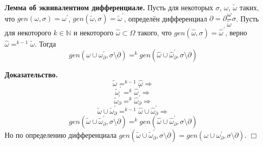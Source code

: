 \textbf{Лемма об эквивалентном дифференциале.} Пусть для некоторых $\sigma$, $\omega$, $\tilde{\omega}$ таких, что $gen(\omega, \sigma) = \omega^\prime$, $gen(\tilde{\omega}, \sigma) = \tilde{\omega}^\prime$, определён дифференциал $\partial = \partial\dfrac{\omega}{\tilde{\omega}}\sigma$. Пусть для некоторого $k \in \mathbb{N}$ и некоторого $\hat{\omega} \subset \Omega$ такого, что $gen(\hat{\omega}, \sigma) = \hat{\omega}^\prime$, верно $\hat{\omega} =^{k-1} \tilde{\omega}$. Тогда $$gen(\omega \cup \omega^\prime_\partial, \sigma\setminus\partial) =^k gen(\hat{\omega} \cup \hat{\omega}^\prime_\partial, \sigma\setminus\partial)$$

\textbf{Доказательство.}
$$\tilde{\omega} =^{k-1} \hat{\omega} \Rightarrow$$
$$\tilde{\omega}^\prime =^{k} \hat{\omega}^\prime \Rightarrow$$
$$\tilde{\omega}^\prime_\partial =^{k} \hat{\omega}^\prime_\partial \Rightarrow$$
$$\tilde{\omega} \cup \tilde{\omega}^\prime_\partial =^{k-1} \hat{\omega} \cup \hat{\omega}^\prime_\partial \Rightarrow$$
$$gen(\tilde{\omega} \cup \tilde{\omega}^\prime_\partial, \sigma\setminus\partial) =^{k} gen(\hat{\omega} \cup \hat{\omega}^\prime_\partial, \sigma\setminus\partial)$$
Но по определению дифференциала $gen(\tilde{\omega} \cup \tilde{\omega}^\prime_\partial, \sigma\setminus\partial) = gen(\omega \cup \omega^\prime_{\partial}, \sigma\setminus\partial)$. $\Box$\\

\begin{comment}
	Вопрос: верно ли, что в условиях инкрементального случая (там, где $\Delta^\rho_\alpha\sigma$)

	$$\partial\dfrac{\omega_\rho}{\omega_\alpha}(\sigma\setminus\rho)\subseteq\xi$$ ?

	\textbf{Доказательство:}

	\newcommand{\mypart}{\partial\dfrac{\omega_\rho}{\omega_\alpha}(\sigma\setminus\rho)}

	Докажем, что если $s \in \sigma\setminus\rho$, $s \notin \xi$, то $s \notin \mypart$. Обозначим $\tau = (\sigma\setminus\rho)\setminus\mypart$, тогда $\tau$ --- наибольшее подмножество $\sigma\setminus\rho$, такое, что $gen(\omega_\rho, \tau)$ определено $\Leftrightarrow$ $gen(\omega_\alpha, \tau)$ определено. Предположим, $s \in \mypart$, тогда $s \notin \tau$. Рассмотрим $gen(\omega_\rho, \tau)$.
\end{comment}
